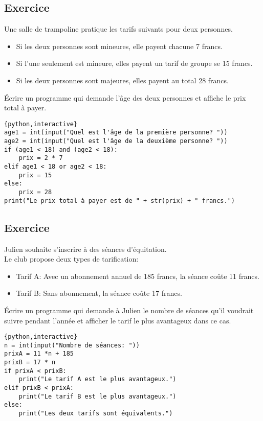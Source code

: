 \documentclass[a4paper,11pt]{article}
\begin{document}
\subsection{Exercice}
Une salle de trampoline pratique les tarifs suivants pour deux personnes.\\
\begin{itemize}
    \item Si les deux personnes sont mineures, elle payent chacune 7 francs.
    \item Si l'une seulement est mineure, elles payent un tarif de groupe se 15 francs.
    \item Si les deux personnes sont majeures, elles payent au total 28 francs.
\end{itemize}
Écrire un programme qui demande l'âge des deux personnes et affiche le prix total à payer.
\begin{solution}
\begin{verbatim}{python,interactive}
age1 = int(input("Quel est l'âge de la première personne? "))
age2 = int(input("Quel est l'âge de la deuxième personne? "))
if (age1 < 18) and (age2 < 18):
    prix = 2 * 7
elif age1 < 18 or age2 < 18:
    prix = 15
else:
    prix = 28
print("Le prix total à payer est de " + str(prix) + " francs.")
\end{verbatim}
\end{solution}

\subsection{Exercice}
Julien souhaite s'inscrire à des séances d'équitation.\\
Le club propose deux types de tarification:
\begin{itemize}
    \item Tarif A: Avec un abonnement annuel de 185 francs, la séance coûte 11 francs.
    \item Tarif B: Sans abonnement, la séance coûte 17 francs.
\end{itemize}
Écrire un programme qui demande à Julien le nombre de séances qu'il voudrait suivre pendant l'année et afficher le tarif le plus avantageux dans ce cas.
\begin{solution}
\begin{verbatim}{python,interactive}
n = int(input("Nombre de séances: "))
prixA = 11 *n + 185
prixB = 17 * n
if prixA < prixB:
    print("Le tarif A est le plus avantageux.")
elif prixB < prixA:
    print("Le tarif B est le plus avantageux.")
else:
    print("Les deux tarifs sont équivalents.")
\end{verbatim}
\end{solution}
\end{document}
